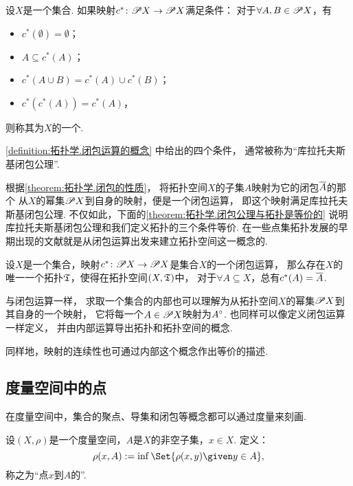 \begin{definition}\label{definition:拓扑学.闭包运算的概念}
设\(X\)是一个集合.
如果映射\(c^*\colon \mathscr{P} X \to \mathscr{P} X\)满足条件：
对于\(\forall A,B \in \mathscr{P} X\)，有\begin{itemize}
	\item \(c^*(\emptyset) = \emptyset\)；
	\item \(A \subseteq c^*(A)\)；
	\item \(c^*(A \cup B) = c^*(A) \cup c^*(B)\)；
	\item \(c^*(c^*(A)) = c^*(A)\)，
\end{itemize}
则称其为\(X\)的一个.
\end{definition}
\cref{definition:拓扑学.闭包运算的概念} 中给出的四个条件，
通常被称为“库拉托夫斯基闭包公理”.

根据\cref{theorem:拓扑学.闭包的性质}，
将拓扑空间\(X\)的子集\(A\)映射为它的闭包\(\overline{A}\)的那个
从\(X\)的幂集\(\mathscr{P} X\)到自身的映射，便是一个闭包运算，
即这个映射满足库拉托夫斯基闭包公理.
不仅如此，下面的\cref{theorem:拓扑学.闭包公理与拓扑是等价的}
说明库拉托夫斯基闭包公理和我们定义拓扑的三个条件等价.
在一些点集拓扑发展的早期出现的文献就是从闭包运算出发来建立拓扑空间这一概念的.

\begin{theorem}\label{theorem:拓扑学.闭包公理与拓扑是等价的}
设\(X\)是一个集合，映射\(c^*\colon \mathscr{P} X \to \mathscr{P} X\)是集合\(X\)的一个闭包运算，
那么存在\(X\)的唯一一个拓扑\({\mathfrak T}\)，使得在拓扑空间\((X,{\mathfrak T})\)中，
对于\(\forall A \subseteq X\)，总有\(c^*(A) = \overline{A}\).
\end{theorem}

与闭包运算一样，
求取一个集合的内部也可以理解为从拓扑空间\(X\)的幂集\(\mathscr{P} X\)到其自身的一个映射，
它将每一个\(A \in \mathscr{P} X\)映射为\(A^\circ\).
也同样可以像定义闭包运算一样定义，
并由内部运算导出拓扑和拓扑空间的概念.

同样地，映射的连续性也可通过内部这个概念作出等价的描述.

\subsection{度量空间中的点}

在度量空间中，集合的聚点、导集和闭包等概念都可以通过度量来刻画.

\begin{definition}\label{definition:拓扑学.点到点集的距离}
设\((X,\rho)\)是一个度量空间，\(A\)是\(X\)的非空子集，\(x \in X\).
定义：\begin{equation*}
	\rho(x,A) \defeq \inf\Set{ \rho(x,y) \given y \in A },
\end{equation*}
称之为“点\(x\)到\(A\)的”.
\end{definition}

